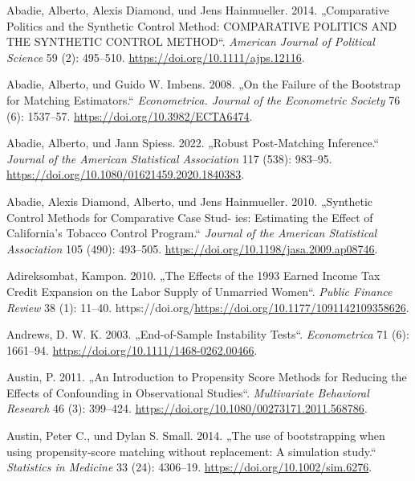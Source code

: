 \documentclass[
  a4paper,
  DIV=11,
  oneside]{scrreprt}
\newlength{\cslhangindent}
\newenvironment{CSLReferences}[2] %
 {\begin{list}{}{%
  \setlength{\itemindent}{0pt}
  \setlength{\leftmargin}{0pt}
  \setlength{\parsep}{0pt}
  \ifodd #1
   \setlength{\leftmargin}{\cslhangindent}
   \setlength{\itemindent}{-1\cslhangindent}
  \fi
  \setlength{\itemsep}{#2\baselineskip}}}
 {\end{list}}
\begin{document}
\label{refs}
\begin{CSLReferences}{1}{0}
Abadie, Alberto, Alexis Diamond, und Jens Hainmueller. 2014.
{„Comparative Politics and the Synthetic Control Method: COMPARATIVE
POLITICS AND THE SYNTHETIC CONTROL METHOD``}. \emph{American Journal of
Political Science} 59 (2): 495--510.
\url{https://doi.org/10.1111/ajps.12116}.

Abadie, Alberto, und Guido W. Imbens. 2008. {„On the Failure of the
Bootstrap for Matching Estimators.``} \emph{Econometrica. Journal of the
Econometric Society} 76 (6): 1537--57.
\url{https://doi.org/10.3982/ECTA6474}.

Abadie, Alberto, und Jann Spiess. 2022. {„Robust Post-Matching
Inference.``} \emph{Journal of the American Statistical Association} 117
(538): 983--95. \url{https://doi.org/10.1080/01621459.2020.1840383}.

Abadie, Alexis Diamond, Alberto, und Jens Hainmueller. 2010. {„Synthetic
Control Methods for Comparative Case Stud- ies: Estimating the Effect of
California's Tobacco Control Program.``} \emph{Journal of the American
Statistical Association} 105 (490): 493--505.
\url{https://doi.org/10.1198/jasa.2009.ap08746}.

Adireksombat, Kampon. 2010. {„The Effects of the 1993 Earned Income Tax
Credit Expansion on the Labor Supply of Unmarried Women``}. \emph{Public
Finance Review} 38 (1): 11--40.
https://doi.org/\url{https://doi.org/10.1177/1091142109358626}.

Andrews, D. W. K. 2003. {„End-of-Sample Instability Tests``}.
\emph{Econometrica} 71 (6): 1661--94.
\url{https://doi.org/10.1111/1468-0262.00466}.

Austin, P. 2011. {„An Introduction to Propensity Score Methods for
Reducing the Effects of Confounding in Observational Studies``}.
\emph{Multivariate Behavioral Research} 46 (3): 399--424.
\url{https://doi.org/10.1080/00273171.2011.568786}.

Austin, Peter C., und Dylan S. Small. 2014. {„The use of bootstrapping
when using propensity-score matching without replacement: A simulation
study.``} \emph{Statistics in Medicine} 33 (24): 4306--19.
\url{https://doi.org/10.1002/sim.6276}.


\end{CSLReferences}
\end{document}
